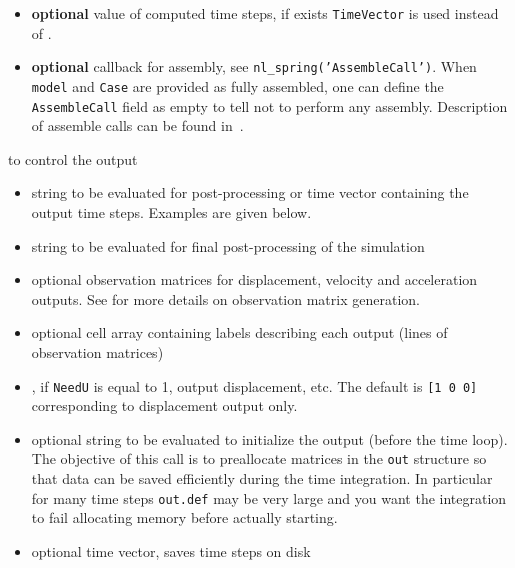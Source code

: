 \begin{itemize}
\item {} {\bf optional} value of computed time steps, if exists {\tt TimeVector} is used instead of . \\

\item {} {\bf optional} callback for assembly, see {\tt nl\_spring('AssembleCall')}. When {\tt model} and {\tt Case} are provided as fully assembled, one can define the {\tt AssembleCall} field as empty to tell \fetime not to perform any assembly. Description of assemble calls can be found in~. 


\end{itemize}

to control the output

\begin{itemize}
\item {}  string to be evaluated for post-processing or time vector containing the output time steps. Examples are given below.
\item {}  string to be evaluated for final post-processing of the simulation\\

\item  {}  optional observation matrices for displacement, velocity and acceleration outputs. See  for more details on observation matrix generation. 

\item {}  optional cell array containing labels describing each output (lines of observation matrices)

\item {} , if {\tt NeedU} is equal to 1,
output displacement, etc. The default is {\tt [1 0 0]} corresponding to displacement output only. 

\item {}  optional string to be evaluated to initialize the output (before the time loop). The objective of this call is to preallocate matrices in the {\tt out} structure so that data can be saved efficiently during the time integration. In particular for many time steps {\tt out.def} may be very large and you want the integration to fail allocating memory before actually starting. 

\item {}   optional time vector, saves time steps on disk


\end{itemize}

